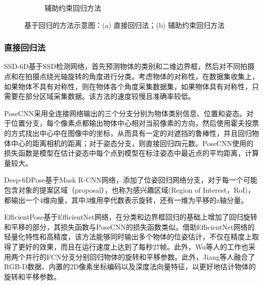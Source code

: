 \begin{figure}[htbp]
\begin{subfigure}[b]{0.95\textwidth}
        \caption{辅助约束回归方法}
        \label{fig:基于辅助约束的回归方法}
    \end{subfigure}
    \caption{基于回归的方法示意图：(a) 直接回归法；(b) 辅助约束回归方法}
    \label{fig:基于回归的方法}
\end{figure}

\subsubsection{直接回归法}\label{直接回归法}

\par SSD-6D\cite{ssd6d}基于SSD检测网络\cite{ssd}，首先预测物体的类别和二维边界框，然后对不同拍摄点和在拍摄点绕光轴旋转的角度进行分类。考虑物体的对称性，在数据集收集上，如果物体不具有对称性，则在物体各个角度采集数据集，如果物体具有对称性，只需要在部分区域采集数据。该方法的速度较慢且准确率较低。

\par PoseCNN\cite{ycbv}采用全连接网络输出的三个分支分别为物体类别信息、位置和姿态。对于位置分支，每个像素点都输出物体中心相对当前像素的方向，然后使用霍夫投票的方式找出中心中在图像中的坐标，从而具有一定的对遮挡的鲁棒性，并且回归物体中心的距离相机的距离；对于姿态分支，则直接回归四元数。PoseCNN使用的损失函数是模型在估计姿态中每个点到模型在标注姿态中最近点的平均距离，计算量较大。

\par Deep-6DPose\cite{Deep-6DPose}基于Mask R-CNN网络\cite{maskrcnn}，添加了位姿回归网络分支，对于每一个可能包含对象的提案区域（proposal），也称为感兴趣区域(Region of Interest，RoI)，都输出一个4维向量，其中3维用李代数表示旋转，还有一维为平移的z轴分量。

\par EfficientPose\cite{bukschat2020efficientpose}基于EfficientNet网络\cite{koonce2021efficientnet}，在分类和边界框回归的基础上增加了回归旋转和平移的部分，其损失函数与PoseCNN的损失函数类似。借助EfficientNet网络的轻量化特性和高精度，该方法能够同时输出多个物体的位姿估计，不仅在精度上取得了更好的效果，而且在运行速度上达到了每秒27帧。此外，Wu等人的工作\cite{wu2018real}也采用两个并行的FCN\cite{FCN}分支分别回归物体的旋转和平移参数。此外，Jiang等人\cite{jiang2022uni6d}融合了RGB-D数据、内置的2D像素坐标编码以及深度法向量特征，以更好地估计物体的旋转和平移参数。

